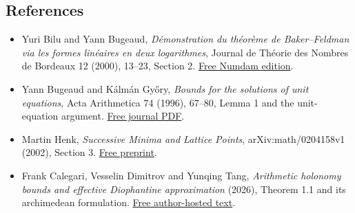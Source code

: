 \documentclass[
  11pt,
  a4paper,
]{article}
\providecommand{\tightlist}{%
  \setlength{\itemsep}{0pt}\setlength{\parskip}{0pt}}
\begin{document}
\subsection{References}\label{references}

\begin{itemize}
\tightlist
\item
  Yuri Bilu and Yann Bugeaud, \emph{Démonstration du théorème de
  Baker--Feldman via les formes linéaires en deux logarithmes}, Journal
  de Théorie des Nombres de Bordeaux 12 (2000), 13--23, Section 2.
  \href{https://numdam.org/item/JTNB_2000__12_1_13_0/}{Free Numdam
  edition}.
\item
  Yann Bugeaud and Kálmán Győry, \emph{Bounds for the solutions of unit
  equations}, Acta Arithmetica 74 (1996), 67--80, Lemma 1 and the
  unit-equation argument.
  \href{https://matwbn.icm.edu.pl/ksiazki/aa/aa74/aa7416.pdf}{Free
  journal PDF}.
\item
  Martin Henk, \emph{Successive Minima and Lattice Points},
  arXiv:math/0204158v1 (2002), Section 3.
  \href{https://arxiv.org/abs/math/0204158}{Free preprint}.
\item
  Frank Calegari, Vesselin Dimitrov and Yunqing Tang, \emph{Arithmetic
  holonomy bounds and effective Diophantine approximation} (2026),
  Theorem 1.1 and its archimedean formulation.
  \href{https://math.uchicago.edu/~fcale/papers/ICM.pdf}{Free
  author-hosted text}.
\end{itemize}
\end{document}
